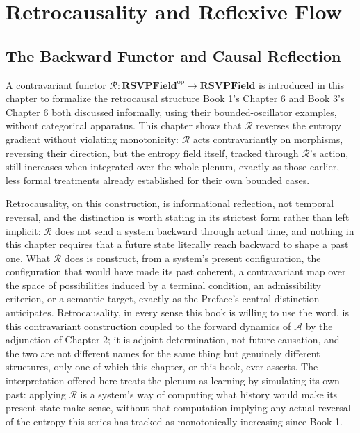 \part{Retrocausality and Reflexive Flow}

\chapter{The Backward Functor and Causal Reflection}

A contravariant functor $\mathcal{R}: \mathbf{RSVPField}^{\text{op}} \to \mathbf{RSVPField}$ is introduced in this chapter to formalize the retrocausal structure Book 1's Chapter 6 and Book 3's Chapter 6 both discussed informally, using their bounded-oscillator examples, without categorical apparatus. This chapter shows that $\mathcal{R}$ reverses the entropy gradient without violating monotonicity: $\mathcal{R}$ acts contravariantly on morphisms, reversing their direction, but the entropy field itself, tracked through $\mathcal{R}$'s action, still increases when integrated over the whole plenum, exactly as those earlier, less formal treatments already established for their own bounded cases.

Retrocausality, on this construction, is informational reflection, not temporal reversal, and the distinction is worth stating in its strictest form rather than left implicit: $\mathcal{R}$ does not send a system backward through actual time, and nothing in this chapter requires that a future state literally reach backward to shape a past one. What $\mathcal{R}$ does is construct, from a system's present configuration, the configuration that would have made its past coherent, a contravariant map over the space of possibilities induced by a terminal condition, an admissibility criterion, or a semantic target, exactly as the Preface's central distinction anticipates. Retrocausality, in every sense this book is willing to use the word, is this contravariant construction coupled to the forward dynamics of $\mathcal{A}$ by the adjunction of Chapter 2; it is adjoint determination, not future causation, and the two are not different names for the same thing but genuinely different structures, only one of which this chapter, or this book, ever asserts. The interpretation offered here treats the plenum as learning by simulating its own past: applying $\mathcal{R}$ is a system's way of computing what history would make its present state make sense, without that computation implying any actual reversal of the entropy this series has tracked as monotonically increasing since Book 1.

